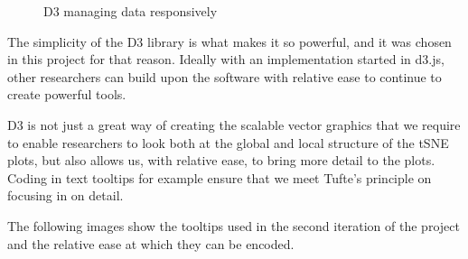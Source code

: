 \documentclass[a4paper,11pt,titlepage]{article}
\begin{document}
	\begin{figure}[H]
    			\caption{D3 managing data responsively}%
	\end{figure}	
	
	The simplicity of the D3 library is what makes it so powerful, and it was chosen in this project for that reason. Ideally with an implementation started in d3.js, other researchers can build upon the software with relative ease to continue to create powerful tools. 
	\par 
	D3 is not just a great way of creating the scalable vector graphics that we require to enable researchers to look both at the global and local structure of the tSNE plots, but also allows us, with relative ease, to bring more detail to the plots. Coding in text tooltips for example ensure that we meet Tufte's principle on focusing in on detail. 
	\par 
	The following images show the tooltips used in the second iteration of the project and the relative ease at which they can be encoded.
	
	\begin{figure}[H]
    			\centering	
    			\qquad
    			\caption{ }%
    			\label{fig:iter2}
	\end{figure}	
\end{document}
